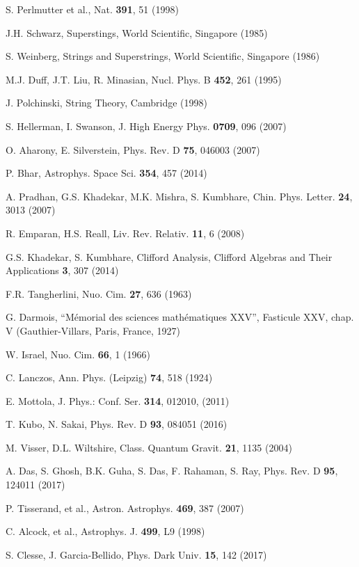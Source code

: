\documentclass[preprint,12pt]{elsarticle}
\begin{document}
\begin{thebibliography}{99}
 S. Perlmutter et al., Nat. \textbf{391}, 51 (1998)

 J.H. Schwarz, Superstings, World Scientific, Singapore (1985)

 S. Weinberg, Strings and Superstrings, World Scientific, Singapore (1986)

 M.J. Duff, J.T. Liu, R. Minasian, Nucl. Phys. B {\bf 452}, 261 (1995)

 J. Polchinski, String Theory, Cambridge (1998)

 S. Hellerman, I. Swanson, J. High Energy Phys. {\bf 0709}, 096 (2007)

 O. Aharony,  E. Silverstein, Phys. Rev. D {\bf 75}, 046003 (2007)

 P. Bhar, Astrophys. Space Sci. \textbf{354}, 457 (2014)

  A. Pradhan,  G.S. Khadekar,  M.K. Mishra,  S. Kumbhare, Chin. Phys. Letter. {\bf 24}, 3013 (2007)

  R. Emparan, H.S. Reall, Liv. Rev. Relativ. {\bf 11}, 6 (2008)

 G.S. Khadekar, S. Kumbhare, Clifford Analysis, Clifford Algebras and Their Applications {\bf 3}, 307 (2014)

 F.R. Tangherlini, Nuo. Cim. \textbf{27}, 636 (1963)

 G. Darmois, “M{\'e}morial des sciences math{\'e}matiques XXV”,
Fasticule XXV, chap. V (Gauthier-Villars, Paris, France, 1927)

 W. Israel, Nuo. Cim. \textbf{66}, 1 (1966)

 C. Lanczos, Ann. Phys. (Leipzig) \textbf{74}, 518 (1924)

 E. Mottola, J. Phys.: Conf. Ser. \textbf{314}, 012010, (2011)

 T. Kubo, N. Sakai, Phys. Rev. D \textbf{93}, 084051 (2016)

 M. Visser, D.L. Wiltshire, Class. Quantum Gravit. \textbf{21}, 1135 (2004)

 A. Das, S. Ghosh, B.K. Guha, S. Das, F. Rahaman, S. Ray, Phys. Rev. D \textbf{95}, 124011 (2017)

 P. Tisserand, et al., Astron. Astrophys. \textbf{469}, 387 (2007)

 C. Alcock, et al., Astrophys. J. \textbf{499}, L9 (1998)

 S. Clesse, J. Garcia-Bellido, Phys. Dark Univ. \textbf{15}, 142 (2017)

\end{thebibliography}
\end{document}
